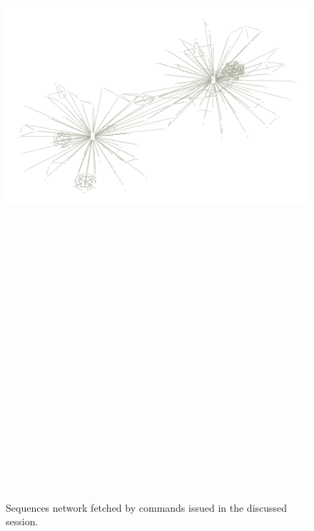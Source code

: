 \newpage
\begin{figure}
\begin{sideways}
\includegraphics[width=20cm, height=30cm]{OEIS/points}
\caption{Sequences network fetched by commands issued in the discussed session.}
\end{sideways}
\label{fig:oeis:sequences:network}
\end{figure}

